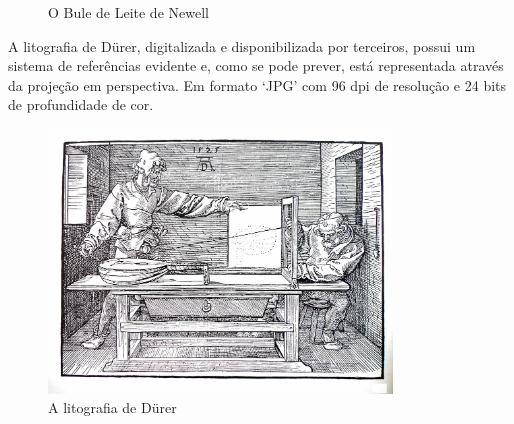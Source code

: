 \begin{figure}[!htb]
	\centering
	\quad
	\caption{O Bule de Leite de Newell}
	\label{utahMilkjugDuplo}
\end{figure}

	A litografia de Dürer, digitalizada e disponibilizada por terceiros, possui um sistema de referências evidente e, como se pode prever, está representada através da projeção em perspectiva. Em formato `JPG' com 96 dpi de resolução e 24 bits de profundidade de cor.
	
\begin{figure}[!htb]
	\centering
	\includegraphics[height=7cm]{imagens/durer.jpg}
	\caption{A litografia de Dürer \cite{durerSite}}
	\label{durerPerspectiva}
\end{figure}
	

